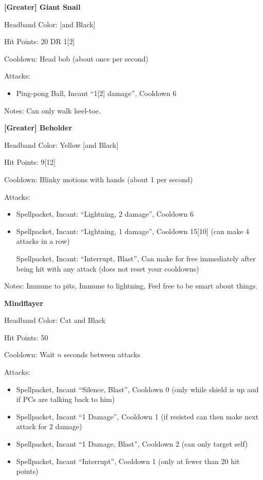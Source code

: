 \documentclass[green]{grimrock}
\begin{document}
\medskip

{\bf [Greater] Giant Snail}

Headband Color: [and Black]

Hit Points: 20 DR 1[2]

Cooldown: Head bob (about once per second)

Attacks:
\begin{itemize}
\item Ping-pong Ball, Incant ``1[2] damage'', Cooldown 6
\end{itemize}

Notes: Can only walk heel-toe.

\medskip

{\bf [Greater] Beholder }

Headband Color: Yellow [and Black]

Hit Points: 9[12]

Cooldown: Blinky motions with hands (about 1 per second)

Attacks:
\begin{itemize}
\item Spellpacket, Incant: ``Lightning, 2 damage'', Cooldown 6
\item Spellpacket, Incant: ``Lightning, 1 damage'', Cooldown 15[10] (can make 4 attacks in a row)
\item [Spellpacket, Incant: ``Interrupt, Blast'', Can make for free immediately after being hit with any attack (does not reset your cooldowns)]
\end{itemize}

Notes: Immune to pits, Immune to lightning, Feel free to be smart about things.

\medskip

{\bf Mindflayer}

Headband Color: Cat and Black

Hit Points: 50

Cooldown: Wait $n$ seconds between attacks

Attacks:
\begin{itemize}
\item Spellpacket, Incant ``Silence, Blast'', Cooldown 0 (only while shield is up and if PCs are talking back to him)
\item Spellpacket, Incant ``1 Damage'', Cooldown 1 (if resisted can then make next attack for 2 damage)
\item Spellpacket, Incant ``1 Damage, Blast'', Cooldown 2 (can only target self)
\item Spellpacket, Incant ``Interrupt'', Cooldown 1 (only at fewer than 20 hit points)
\end{itemize}
\end{document}
